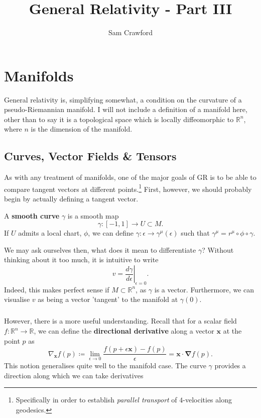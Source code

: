\documentclass[11pt,fleqn]{report}
\begin{document}
	
\title{General Relativity - Part III}
\author{Sam Crawford}

\maketitle
\tableofcontents
\listoftodos

\chapter{Manifolds}

General relativity is, simplifying somewhat, a condition on the curvature of a pseudo-Riemannian manifold. I will not include a definition of a manifold here, other than to say it is a topological space which is locally diffeomorphic to $\mathbb{R}^n$, where $n$ is the dimension of the manifold.

\section{Curves, Vector Fields \& Tensors}

As with any treatment of manifolds, one of the major goals of GR is to be able to compare tangent vectors at different points.\footnote{Specifically in order to establish \textit{parallel transport} of $4$-velocities along geodesics.}
First, however, we should probably begin by actually defining a tangent vector.

\begin{definition}
A \textbf{smooth curve} $\gamma$ is a smooth map \begin{equation}
\gamma : [-1,1] \to U \subset M.
\end{equation}
If $U$ admits a local chart, $\phi$, we can define $\gamma: \epsilon \to \gamma^\mu(\epsilon)$ such that $\gamma^\mu = r^\mu\circ\phi\circ\gamma$.
\end{definition}
We may ask ourselves then, what does it mean to differentiate $\gamma$? Without thinking about it too much, it is intuitive to write \begin{equation}
v = \left. \frac{d\gamma}{d\epsilon} \right\vert_{\epsilon = 0}.
\end{equation}
Indeed, this makes perfect sense if $M \subset \mathbb{R}^n$, as $\gamma$ is a vector. Furthermore, we can visualise $v$ as being a vector 'tangent' to the manifold at $\gamma(0)$.

\paragraph{} However, there is a more useful understanding. Recall that for a scalar field $f: \mathbb{R}^n \to \mathbb{R}$, we can define the \textbf{directional derivative} along a vector $\mathbf{x}$ at the point $p$ as
	\begin{equation}
		\nabla_\mathbf{x} f (p) \coloneqq \lim_{\epsilon \to 0} \frac{
			f(p + \epsilon \mathbf{x}) - f(p)
		}{
			\epsilon
		} = \mathbf{x} \cdot \boldsymbol{\nabla}f(p).
	\end{equation}
This notion generalises quite well to the manifold case. The curve $\gamma$ provides a direction along which we can take derivatives
\end{document}
